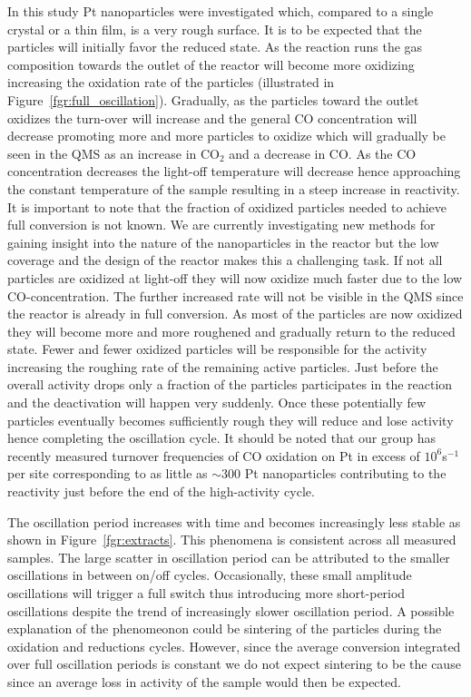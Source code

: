 \documentclass[journal=jacsat,manuscript=article]{achemso}
\begin{document}
In this study Pt nanoparticles were investigated which, compared to a single crystal or a thin film, is a very rough surface. It is to be expected that the particles will initially favor the reduced state. As the reaction runs the gas composition towards the outlet of the reactor will become more oxidizing increasing the oxidation rate of the particles (illustrated in Figure~\ref{fgr:full_oscillation}). Gradually, as the particles toward the outlet oxidizes the turn-over will increase and the general CO concentration will decrease promoting more and more particles to oxidize which will gradually be seen in the QMS as an increase in CO$_2$ and a decrease in CO. As the CO concentration decreases the light-off temperature will decrease hence approaching the constant temperature of the sample resulting in a steep increase in reactivity. It is important to note that the fraction of oxidized particles needed to achieve full conversion is not known. We are currently investigating new methods for gaining insight into the nature of the nanoparticles in the reactor but the low coverage and the design of the reactor makes this a challenging task. If not all particles are oxidized at light-off they will now oxidize much faster due to the low CO-concentration. The further increased rate will not be visible in the QMS since the reactor is already in full conversion. As most of the particles are now oxidized they will become more and more roughened and gradually return to the reduced state. Fewer and fewer oxidized particles will be responsible for the activity increasing the roughing rate of the remaining active particles. Just before the overall activity drops only a fraction of the particles participates in the reaction and the deactivation will happen very suddenly. Once these potentially few particles eventually becomes sufficiently rough they will reduce and lose activity hence completing the oscillation cycle. It should be noted that our group has recently measured turnover frequencies of CO oxidation on Pt in excess of $10^{6}$s$^{-1}$ per site corresponding to as little as $\sim$300 Pt nanoparticles contributing to the reactivity just before the end of the high-activity cycle.

The oscillation period increases with time and becomes increasingly less stable as shown in Figure~\ref{fgr:extracts}. This phenomena is consistent across all measured samples. The large scatter in oscillation period can be attributed to the smaller oscillations in between on/off cycles. Occasionally, these small amplitude oscillations will trigger a full switch thus introducing more short-period oscillations despite the trend of increasingly slower oscillation period. A possible explanation of the phenomeonon could be sintering of the particles during the oxidation and reductions cycles. However, since the average conversion integrated over full oscillation periods is constant we do not expect sintering to be the cause since an average loss in activity of the sample would then be expected.
\end{document}
